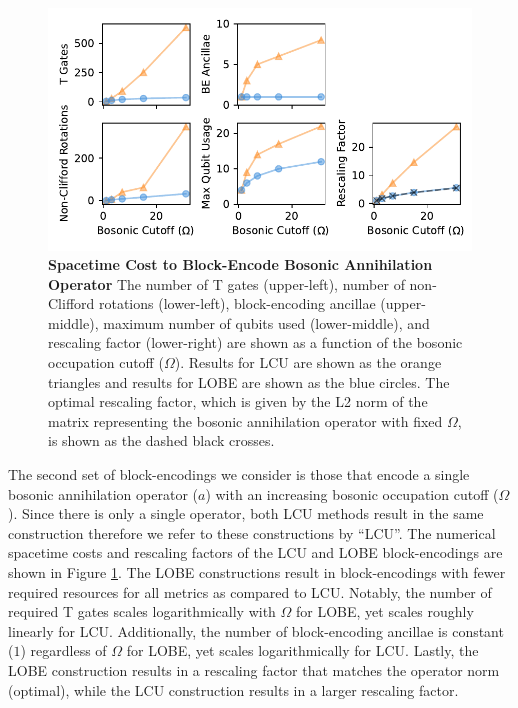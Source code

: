 \begin{figure}
    \centering
    \includegraphics[width=14cm]{figures/bosonic-comparison.pdf}
    \caption{
        \textbf{Spacetime Cost to Block-Encode Bosonic Annihilation Operator}
        The number of T gates (upper-left), number of non-Clifford rotations (lower-left), block-encoding ancillae (upper-middle), maximum number of qubits used (lower-middle), and rescaling factor (lower-right) are shown as a function of the bosonic occupation cutoff ($\Omega$).
        Results for LCU are shown as the orange triangles and results for LOBE are shown as the blue circles.
        The optimal rescaling factor, which is given by the L2 norm of the matrix representing the bosonic annihilation operator with fixed $\Omega$, is shown as the dashed black crosses. 
    }
    \label{fig:bosonic-comparison}
\end{figure}

The second set of block-encodings we consider is those that encode a single bosonic annihilation operator ($a$) with an increasing bosonic occupation cutoff ($\Omega$).
Since there is only a single operator, both LCU methods result in the same construction therefore we refer to these constructions by ``LCU''.
The numerical spacetime costs and rescaling factors of the LCU and LOBE block-encodings are shown in Figure \ref{fig:bosonic-comparison}.
The LOBE constructions result in block-encodings with fewer required resources for all metrics as compared to LCU.
Notably, the number of required T gates scales logarithmically with $\Omega$ for LOBE, yet scales roughly linearly for LCU.
Additionally, the number of block-encoding ancillae is constant ($1$) regardless of $\Omega$ for LOBE, yet scales logarithmically for LCU.
Lastly, the LOBE construction results in a rescaling factor that matches the operator norm (optimal), while the LCU construction results in a larger rescaling factor.

